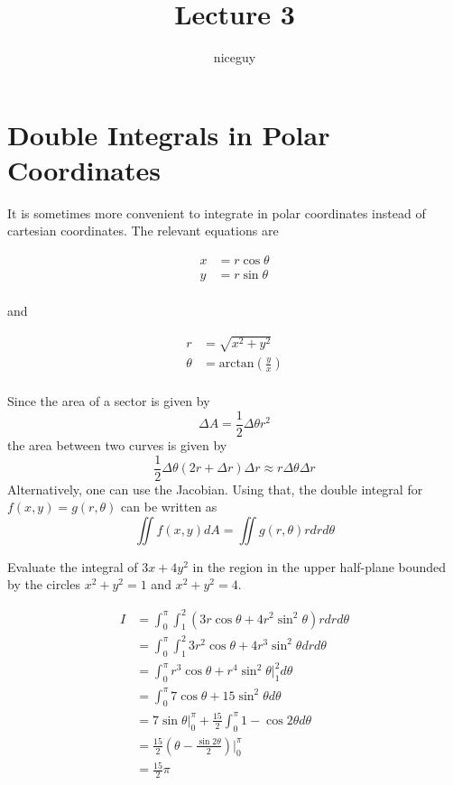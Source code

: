 \documentclass[12pt]{article}
\title{Lecture 3}
\author{niceguy}
\begin{document}
\maketitle

\section{Double Integrals in Polar Coordinates}
It is sometimes more convenient to integrate in polar coordinates instead of cartesian coordinates. The relevant equations are

\begin{align*}
x &= r\cos\theta \\
y &= r\sin\theta \\
\end{align*}

and

\begin{align*}
r &= \sqrt{x^2 + y^2} \\
\theta &= \text{arctan}\left(\frac{y}{x}\right) \\
\end{align*}

Since the area of a sector is given by $$\Delta A = \frac{1}{2} \Delta\theta r^2$$ the area between two curves is given by
$$\frac{1}{2} \Delta\theta (2r + \Delta r) \Delta r \approx r \Delta\theta \Delta r$$
Alternatively, one can use the Jacobian. Using that, the double integral for $f(x,y) = g(r,\theta)$ can be written as
$$\iint f(x,y) dA = \iint g(r,\theta) r dr d\theta$$

\begin{ex}
Evaluate the integral of $3x + 4y^2$ in the region in the upper half-plane bounded by the circles $x^2 + y^2 = 1$ and $x^2 + y^2 = 4$.

\begin{align*}
I &= \int_0^\pi \int_1^2 (3r\cos \theta + 4r^2\sin^2\theta) r dr d\theta \\
&= \int_0^\pi \int_1^2 3r^2\cos\theta + 4r^3\sin^2\theta dr d\theta \\
&= \int_0^\pi r^3\cos\theta + r^4\sin^2\theta \Big |_1^2 d\theta \\
&= \int_0^\pi 7\cos\theta + 15\sin^2\theta d\theta \\
&= 7\sin\theta \Big |_0^\pi + \frac{15}{2}\int_0^\pi 1 - \cos2\theta d\theta \\
&= \frac{15}{2} \left(\theta - \frac{\sin2\theta}{2}\right) \Big |_0^\pi \\
&= \frac{15}{2} \pi \\
\end{align*}
\end{ex}
\end{document}
